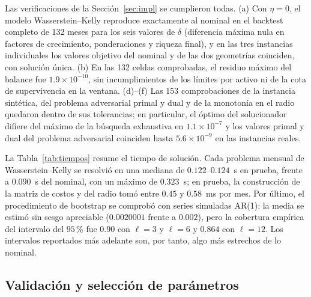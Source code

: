 Las verificaciones de la Sección~\ref{sec:impl} se cumplieron todas. (a) Con $\eta=0$, el modelo Wasserstein--Kelly reproduce exactamente al nominal en el backtest completo de 132 meses para los seis valores de $\delta$ (diferencia máxima nula en factores de crecimiento, ponderaciones y riqueza final), y en las tres instancias individuales los valores objetivo del nominal y de las dos geometrías coinciden, con solución única. (b) En las 132 celdas comprobadas, el residuo máximo del balance fue $1.9\times10^{-10}$, sin incumplimientos de los límites por activo ni de la cota de supervivencia en la ventana. (d)--(f) Las 153 comprobaciones de la instancia sintética, del problema adversarial primal y dual y de la monotonía en el radio quedaron dentro de sus tolerancias; en particular, el óptimo del solucionador difiere del máximo de la búsqueda exhaustiva en $1.1\times10^{-7}$ y los valores primal y dual del problema adversarial coinciden hasta $5.6\times10^{-9}$ en las instancias reales.

La Tabla~\ref{tab:tiempos} resume el tiempo de solución. Cada problema mensual de Wasserstein--Kelly se resolvió en una mediana de $0.122$--$0.124$~s en prueba, frente a $0.090$~s del nominal, con un máximo de $0.323$~s; en prueba, la construcción de la matriz de costos y del radio tomó entre $0.45$ y $0.58$~ms por mes. Por último, el procedimiento de bootstrap se comprobó con series simuladas AR(1): la media se estimó sin sesgo apreciable ($0.0020001$ frente a $0.002$), pero la cobertura empírica del intervalo del $95\,\%$ fue $0.90$ con $\ell=3$ y $\ell=6$ y $0.864$ con $\ell=12$. Los intervalos reportados más adelante son, por tanto, algo más estrechos de lo nominal.



\FloatBarrier %
\subsection{Validación y selección de parámetros}\label{sec:res_validacion}

